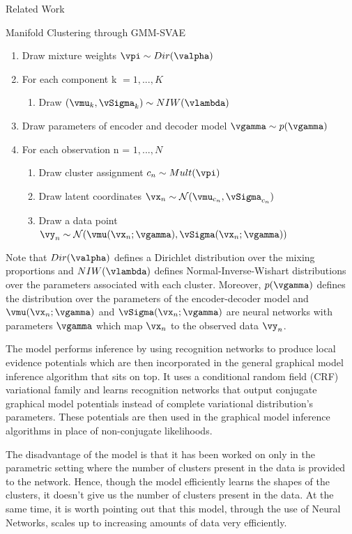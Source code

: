 \documentclass{article}
\begin{document}
\begin{psection}{Related Work}
\begin{psubsection}{Manifold Clustering through GMM-SVAE}
\begin{enumerate}
    \item Draw mixture weights $\vpi \sim Dir(\valpha)$
    \item For each component k $= 1,...,K$
    \begin{enumerate}
        \item Draw $(\vmu_k,\vSigma_k) \sim NIW(\vlambda)$
    \end{enumerate}
    \item Draw parameters of encoder and decoder model $\vgamma \sim p(\vgamma)$
    \item For each observation n = $ 1,...,N$
    \begin{enumerate}
        \item Draw cluster assignment $c_n \sim Mult(\vpi)$
        \item Draw latent coordinates $\vx_n \sim \mathcal{N}(\vmu_{c_n}, \vSigma_{c_n})$
        \item Draw a data point $\vy_n \sim \mathcal{N}(\vmu(\vx_n ; \vgamma), \vSigma(\vx_n;\vgamma)) $
    \end{enumerate}
\end{enumerate}

Note that $Dir(\valpha)$ defines a Dirichlet distribution over the mixing proportions and $NIW(\vlambda)$ defines Normal-Inverse-Wishart distributions over the parameters associated with each cluster. Moreover, $p(\vgamma)$ defines the distribution over the parameters of the encoder-decoder model and $\vmu(\vx_n;\vgamma)$ and $\vSigma(\vx_n;\vgamma)$ are neural networks with parameters $\vgamma$ which map $\vx_n$ to the observed data $\vy_n$.

The model performs inference by using recognition networks to produce local evidence potentials which are then incorporated in the general graphical model inference algorithm that sits on top. It uses a conditional random field (CRF) variational family and learns recognition networks that output conjugate graphical model potentials instead of complete variational distribution's parameters. These potentials are then used in the graphical model inference algorithms in place of non-conjugate likelihoods.

The disadvantage of the model is that it has been worked on only in the parametric setting where the number of clusters present in the data is provided to the network. Hence, though the model efficiently learns the shapes of the clusters, it doesn't give us the number of clusters present in the data. At the same time, it is worth pointing out that this model, through the use of Neural Networks, scales up to increasing amounts of data very efficiently.
\end{psubsection}
\end{psection}
\end{document}

